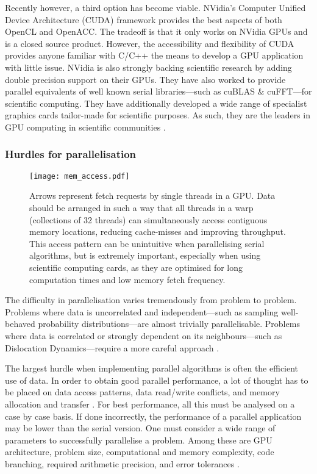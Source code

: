 Recently however, a third option has become viable. NVidia's Computer Unified Device Architecture (CUDA) framework provides the best aspects of both OpenCL and OpenACC. The tradeoff is that it only works on NVidia GPUs and is a closed source product. However, the accessibility and flexibility of CUDA provides anyone familiar with C/C++ the means to develop a GPU application with little issue. NVidia is also strongly backing scientific research by adding double precision support on their GPUs. They have also worked to provide parallel equivalents of well known serial libraries---such as cuBLAS \& cuFFT---for scientific computing. They have additionally developed a wide range of specialist graphics cards tailor-made for scientific purposes. As such, they are the leaders in GPU computing in scientific communities \cite{nvidia}.

\subsubsection{Hurdles for parallelisation}
\label{sc:hurdpara}

\begin{figure}
    \centering
    \texttt{[image: mem\_access.pdf]}
    \caption[Memory access pattern example.]{Arrows represent fetch requests by single threads in a GPU. Data should be arranged in such a way that all threads in a warp (collections of 32 threads) can simultaneously access contiguous memory locations, reducing cache-misses and improving throughput. This access pattern can be unintuitive when parallelising serial algorithms, but is extremely important, especially when using scientific computing cards, as they are optimised for long computation times and low memory fetch frequency.}
    \label{f:mem_accessIntro}
\end{figure}

The difficulty in parallelisation varies tremendously from problem to problem. Problems where data is uncorrelated and independent---such as sampling well-behaved probability distributions---are almost trivially parallelisable. Problems where data is correlated or strongly dependent on its neighbours---such as Dislocation Dynamics---require a more careful approach \cite{parallel_algs}.

The largest hurdle when implementing parallel algorithms is often the efficient use of data. In order to obtain good parallel performance, a lot of thought has to be placed on data access patterns, data read/write conflicts, and memory allocation and transfer \cite{nvidia}. For best performance, all this must be analysed on a case by case basis. If done incorrectly, the performance of a parallel application may be lower than the serial version. One must consider a wide range of parameters to successfully parallelise a problem. Among these are GPU architecture, problem size, computational and memory complexity, code branching, required arithmetic precision, and error tolerances \cite{nvidia, gpu_rev}.

